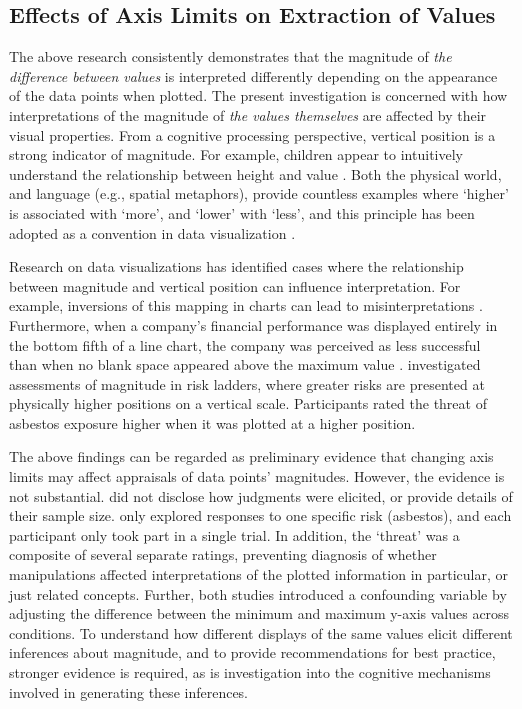 \documentclass[journal]{vgtc}                %
\begin{document}
\hypertarget{effects-of-axis-limits-on-extraction-of-values}{%
\subsection{Effects of Axis Limits on Extraction of Values}\label{effects-of-axis-limits-on-extraction-of-values}}

The above research consistently demonstrates that the magnitude of \emph{the
difference between values} is interpreted differently depending on the
appearance of the data points when plotted. The present investigation is
concerned with how interpretations of the magnitude of \emph{the values
themselves} are affected by their visual properties. From a cognitive
processing perspective, vertical position is a strong indicator of
magnitude. For example, children appear to intuitively understand the
relationship between height and value \citep{gattis_structure_2002}. Both the
physical world, and language (e.g., spatial metaphors), provide
countless examples where `higher' is associated with `more', and `lower'
with `less', and this principle has been adopted as a convention in data
visualization \citep{tversky_cognitive_1997}.

Research on data visualizations has identified cases where the
relationship between magnitude and vertical position can influence
interpretation. For example, inversions of this mapping in charts can
lead to misinterpretations \citep{okan_when_2012, pandey_how_2015, woodin_conceptual_2022}. Furthermore, when a company's financial
performance was displayed entirely in the bottom fifth of a line chart,
the company was perceived as less successful than when no blank space
appeared above the maximum value \citep{taylor_misleading_1986}.
\citet{sandman_high_1994} investigated assessments of magnitude in risk
ladders, where greater risks are presented at physically higher
positions on a vertical scale. Participants rated the threat of asbestos
exposure higher when it was plotted at a higher position.~

The above findings can be regarded as preliminary evidence that changing
axis limits may affect appraisals of data points' magnitudes. However,
the evidence is not substantial. \citet{taylor_misleading_1986} did not
disclose how judgments were elicited, or provide details of their sample
size. \citet{sandman_high_1994} only explored responses to one specific risk
(asbestos), and each participant only took part in a single trial. In
addition, the `threat' was a composite of several separate ratings,
preventing diagnosis of whether manipulations affected interpretations
of the plotted information in particular, or just related concepts.
Further, both studies introduced a confounding variable by adjusting the
difference between the minimum and maximum y-axis values across
conditions. To understand how different displays of the same values
elicit different inferences about magnitude, and to provide
recommendations for best practice, stronger evidence is required, as is
investigation into the cognitive mechanisms involved in generating these
inferences.~
\end{document}
